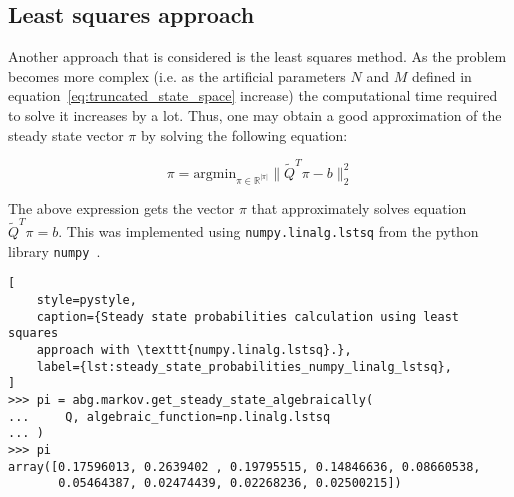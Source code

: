 \subsection{Least squares approach}

Another approach that is considered is the least squares method.
As the problem becomes more complex (i.e. as the artificial parameters \(N\)
and \(M\) defined in equation~\eqref{eq:truncated_state_space} increase)
the computational time required to solve it increases by a lot.
Thus, one may obtain a good approximation of the steady state vector \( \pi \)
by solving the following equation:

\begin{equation}
    \pi = \text{argmin}_{\pi \in \mathbb{R}^{|\pi|}}\|\tilde Q^T \pi - b\|_2^2
\end{equation}

The above expression gets the vector \( \pi \) that approximately solves
equation \(\tilde Q^T \pi = b\).
This was implemented using \texttt{numpy.linalg.lstsq} from the python
library \texttt{numpy}~\cite{2020NumPy-Array}.

\begin{lstlisting}[
    style=pystyle,
    caption={Steady state probabilities calculation using least squares
    approach with \texttt{numpy.linalg.lstsq}.},
    label={lst:steady_state_probabilities_numpy_linalg_lstsq},
]
>>> pi = abg.markov.get_steady_state_algebraically(
...     Q, algebraic_function=np.linalg.lstsq
... )
>>> pi
array([0.17596013, 0.2639402 , 0.19795515, 0.14846636, 0.08660538,
       0.05464387, 0.02474439, 0.02268236, 0.02500215])

\end{lstlisting}



